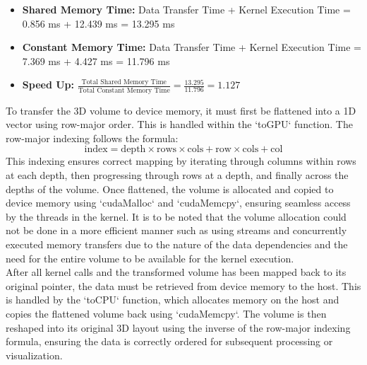 \documentclass[journal,11pt]{IEEEtran}
\begin{document}
\begin{itemize}
    \item \textbf{Shared Memory Time:} Data Transfer Time + Kernel Execution Time = 0.856 ms + 12.439 ms = 13.295 ms
    \item \textbf{Constant Memory Time:} Data Transfer Time + Kernel Execution Time = 7.369 ms + 4.427 ms = 11.796 ms
    \item \textbf{Speed Up:} $\frac{\text{Total Shared Memory Time}}{\text{Total Constant Memory Time}} = \frac{13.295}{11.796} = 1.127$
\end{itemize}

To transfer the 3D volume to device memory, it must first be flattened into a 1D vector using row-major order. This is handled within the `toGPU` function. The row-major indexing follows the formula:  
\begin{equation}
    \text{index} = \text{depth} \times \text{rows} \times \text{cols} + \text{row} \times \text{cols} + \text{col}
\end{equation}  
This indexing ensures correct mapping by iterating through columns within rows at each depth, then progressing through rows at a depth, and finally across the depths of the volume. Once flattened, the volume is allocated and copied to device memory using `cudaMalloc` and `cudaMemcpy`, ensuring seamless access by the threads in the kernel. It is to be noted that the volume allocation could not be done in a more efficient manner such as using streams and concurrently executed memory transfers due to the nature of the data dependencies and the need for the entire volume to be available for the kernel execution.\\

After all kernel calls and the transformed volume has been mapped back to its original pointer, the data must be retrieved from device memory to the host. This is handled by the `toCPU` function, which allocates memory on the host and copies the flattened volume back using `cudaMemcpy`. The volume is then reshaped into its original 3D layout using the inverse of the row-major indexing formula, ensuring the data is correctly ordered for subsequent processing or visualization.\\
\end{document}
